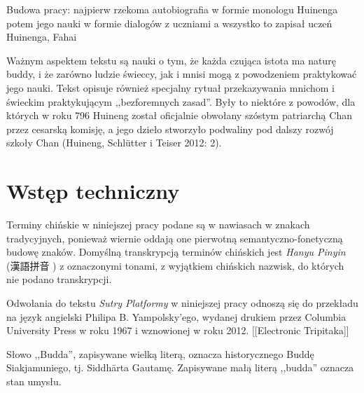Budowa pracy: najpierw rzekoma autobiografia w formie monologu Huinenga
potem jego nauki w formie dialogów z uczniami
a wszystko to zapisał uczeń Huinenga, Fahai
\fi

Ważnym aspektem tekstu są nauki o tym, że każda czująca istota ma naturę buddy, i że zarówno ludzie świeccy, jak i mnisi mogą z powodzeniem praktykować jego nauki. Tekst opisuje również specjalny rytuał przekazywania mnichom i świeckim praktykującym ,,bezforemnych zasad''. %
Były to niektóre z powodów, dla których w roku 796 Huineng został oficjalnie obwołany szóstym patriarchą Chan przez cesarską komisję, a jego dzieło stworzyło podwaliny pod dalszy rozwój szkoły Chan (Huineng, Schlütter i Teiser 2012: 2).

\section{Wstęp techniczny}
Terminy chińskie w niniejszej pracy podane są w nawiasach w znakach tradycyjnych, ponieważ wiernie oddają one pierwotną semantyczno-fonetyczną budowę znaków. Domyślną transkrypcją terminów chińskich jest \textit{Hanyu Pinyin} (漢語拼音 ) z oznaczonymi tonami, z wyjątkiem chińskich nazwisk, do których nie podano transkrypcji.

Odwołania do tekstu \textit{Sutry Platformy} w niniejszej pracy odnoszą się do przekładu na język angielski Philipa B. Yampolsky'ego, wydanej drukiem przez Columbia University Press w roku 1967 i wznowionej w roku 2012. [[Electronic Tripitaka]]

Słowo ,,Budda'', zapisywane wielką literą, oznacza historycznego Buddę Siakjamuniego, tj. Siddhārta Gautamę. Zapisywane małą literą ,,budda'' oznacza stan umysłu.
